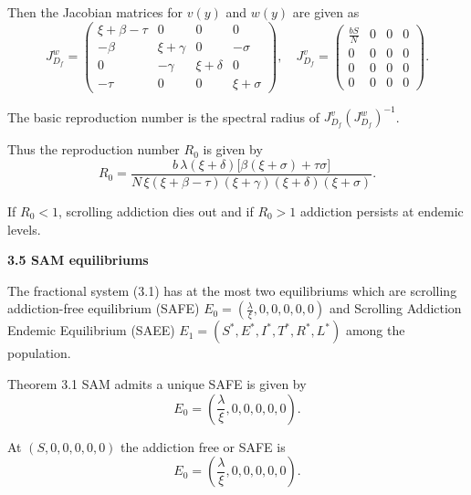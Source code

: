 \documentclass[10pt]{NSP1}
\begin{document}
	Then the Jacobian matrices for \(v(y)\) and \(w(y)\) are given as
	\[
	J_{D_{f}}^{w} = \begin{pmatrix}
		\xi + \beta - \tau & 0 & 0 & 0 \\
		-\beta & \xi + \gamma & 0 & -\sigma \\
		0 & -\gamma & \xi + \delta & 0 \\
		-\tau & 0 & 0 & \xi + \sigma
	\end{pmatrix},
	\quad
	J_{D_{f}}^{v} = \begin{pmatrix}
		\frac{b S}{N} & 0 & 0 & 0 \\
		0 & 0 & 0 & 0 \\
		0 & 0 & 0 & 0 \\
		0 & 0 & 0 & 0
	\end{pmatrix}. \tag{3.11}
	\]
	
	The basic reproduction number is the spectral radius of \(J_{D_{f}}^{v}(J_{D_{f}}^{w})^{-1}\).
	
	Thus the reproduction number \(R_{0}\) is given by
	\[
	R_{0} = \frac{b\,\lambda(\xi + \delta)\bigl[\beta(\xi + \sigma) + \tau\sigma\bigr]}{N\,\xi(\xi + \beta - \tau)(\xi + \gamma)(\xi + \delta)(\xi + \sigma)}. \tag{3.12}
	\]
	
	If \(R_{0} < 1\), scrolling addiction dies out and if \(R_{0} > 1\) addiction persists at endemic levels.
	
	\par\vspace{14.0pt}\noindent \begin{center}\large\bfseries 3.5 SAM equilibriums\end{center}\vspace{14.0pt}
	
	The fractional system (3.1) has at the most two equilibriums which are scrolling addiction-free equilibrium (SAFE) \(E_{0} = (\frac{\lambda}{\xi},0,0,0,0,0)\) and Scrolling Addiction Endemic Equilibrium (SAEE) \(E_{1} = (S^{*},E^{*},I^{*},T^{*},R^{*},L^{*})\) among the population.
	
	Theorem 3.1 SAM admits a unique SAFE is given by
	\[
	E_{0} = \left(\frac{\lambda}{\xi},0,0,0,0,0\right). \tag{3.13}
	\]
	
	\par\vspace{14.0pt}\vspace{14.0pt}
	
	At \((S,0,0,0,0,0)\) the addiction free or SAFE is
	\[
	E_{0} = \left(\frac{\lambda}{\xi},0,0,0,0,0\right). \tag{3.14}
	\]
	
\end{document}
